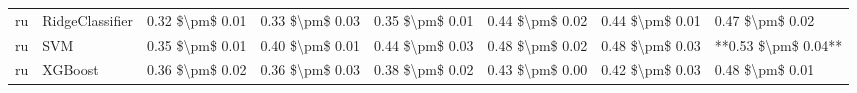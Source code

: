 \begin{tabular}{llllllll}
      ru &                 RidgeClassifier & 0.32 \$\textbackslash pm\$ 0.01 &           0.33 \$\textbackslash pm\$ 0.03 &       0.35 \$\textbackslash pm\$ 0.01 &        0.44 \$\textbackslash pm\$ 0.02 &                         0.44 \$\textbackslash pm\$ 0.01 &     0.47 \$\textbackslash pm\$ 0.02 \\
      ru &                             SVM & 0.35 \$\textbackslash pm\$ 0.01 &           0.40 \$\textbackslash pm\$ 0.01 &       0.44 \$\textbackslash pm\$ 0.03 &        0.48 \$\textbackslash pm\$ 0.02 &                         0.48 \$\textbackslash pm\$ 0.03 & **0.53 \$\textbackslash pm\$ 0.04** \\
      ru &                         XGBoost & 0.36 \$\textbackslash pm\$ 0.02 &           0.36 \$\textbackslash pm\$ 0.03 &       0.38 \$\textbackslash pm\$ 0.02 &        0.43 \$\textbackslash pm\$ 0.00 &                         0.42 \$\textbackslash pm\$ 0.03 &     0.48 \$\textbackslash pm\$ 0.01 \\
\bottomrule
\end{tabular}
